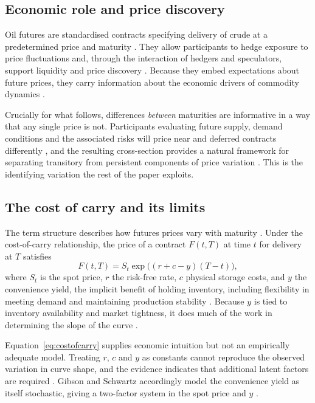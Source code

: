 \documentclass[journal]{IEEEtran}
\begin{document}
\subsection{Economic role and price discovery}

Oil futures are standardised contracts specifying delivery of crude at a predetermined price and maturity \cite{Lee2024}. They allow participants to hedge exposure to price fluctuations \cite{HamiltonWu2014, Anthropelos2015} and, through the interaction of hedgers and speculators, support liquidity and price discovery \cite{KilianMurphy2014, Kaufmann2009}. Because they embed expectations about future prices, they carry information about the economic drivers of commodity dynamics \cite{Gorton2013, Yu2023}.

Crucially for what follows, differences \emph{between} maturities are informative in a way that any single price is not. Participants evaluating future supply, demand conditions and the associated risks will price near and deferred contracts differently \cite{HamiltonWu2014, Cortazar2022}, and the resulting cross-section provides a natural framework for separating transitory from persistent components of price variation \cite{SchwartzSmith2000}. This is the identifying variation the rest of the paper exploits.

\subsection{The cost of carry and its limits}

The term structure describes how futures prices vary with maturity \cite{Gorton2013, HamiltonWu2014}. Under the cost-of-carry relationship, the price of a contract $F(t,T)$ at time $t$ for delivery at $T$ satisfies
%
\begin{equation}
  F(t,T) = S_t \exp\bigl((r + c - y)(T - t)\bigr) ,
  \label{eq:costofcarry}
\end{equation}
%
where $S_t$ is the spot price, $r$ the risk-free rate, $c$ physical storage costs, and $y$ the convenience yield, the implicit benefit of holding inventory, including flexibility in meeting demand and maintaining production stability \cite{GibsonSchwartz1990, Alquist2014}. Because $y$ is tied to inventory availability and market tightness, it does much of the work in determining the slope of the curve \cite{KilianMurphy2014}.

Equation~\eqref{eq:costofcarry} supplies economic intuition but not an empirically adequate model. Treating $r$, $c$ and $y$ as constants cannot reproduce the observed variation in curve shape, and the evidence indicates that additional latent factors are required \cite{SchwartzSmith2000, CasassusCollinDufresne2005}. Gibson and Schwartz accordingly model the convenience yield as itself stochastic, giving a two-factor system in the spot price and $y$ \cite{GibsonSchwartz1990}.
\end{document}
